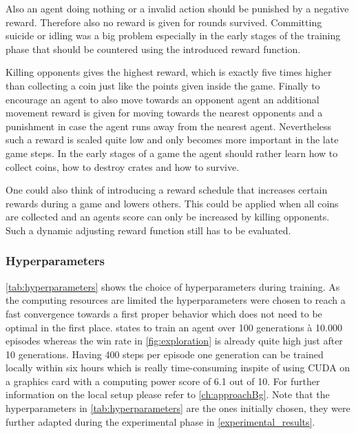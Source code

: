 Also an agent doing nothing or a invalid action should be punished by a negative reward. Therefore also no reward is given for rounds survived. Committing suicide or idling was a big problem especially in the early stages of the training phase that should be countered using the introduced reward function. 

Killing opponents gives the highest reward, which is exactly five times higher than collecting a coin just like the points given inside the game. Finally to encourage an agent to also move towards an opponent agent an additional movement reward is given for moving towards the nearest opponents and a punishment in case the agent runs away from the nearest agent. Nevertheless such a reward is scaled quite low and only becomes more important in the late game steps. In the early stages of a game the agent should rather learn how to collect coins, how to destroy crates and how to survive. 

One could also think of introducing a reward schedule that increases certain rewards during a game and lowers others. This could be applied when all coins are collected and an agents score can only be increased by killing opponents. Such a dynamic adjusting reward function still has to be evaluated.

\subsubsection{Hyperparameters}
\label{ch:approachBe}

\autoref{tab:hyperparameters} shows the choice of hyperparameters during training. As the computing resources are limited the hyperparameters were chosen to reach a fast convergence towards a first proper behavior which does not need to be optimal in the first place. \cite{Kormelink2018} states to train an agent over 100 generations à 10.000 episodes whereas the win rate in \autoref{fig:exploration} is already quite high just after 10 generations. Having 400 steps per episode one generation can be trained locally within six hours which is really time-consuming inspite of using CUDA on a graphics card with a computing power score of 6.1 out of 10. For further information on the local setup please refer to \autoref{ch:approachBg}. Note that the hyperparameters in \autoref{tab:hyperparameters} are the ones initially chosen, they were further adapted during the experimental phase in \autoref{experimental_results}.

